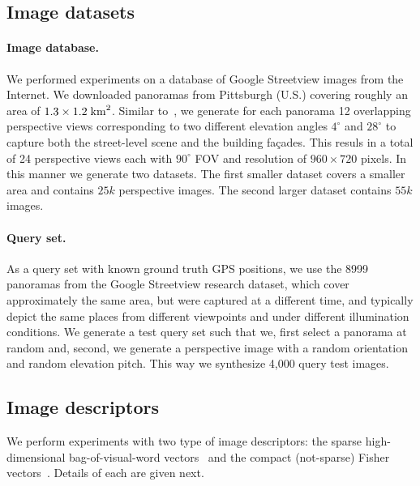         \subsection{Image datasets}
        \paragraph{Image database.}
        We performed experiments on a database of Google Streetview images from the Internet. We downloaded panoramas from Pittsburgh (U.S.) covering roughly an area of $1.3 \times 1.2 \; {\rm km}^2$. Similar to~\cite{Chen11}, we generate for each panorama 12 overlapping perspective views corresponding to two different elevation angles $4^\circ$ and $28^\circ$ to capture both the street-level scene and the building fa\c{c}ades. This resuls in a total of 24 perspective views each with $90^\circ$ FOV and resolution of $960 \times 720$ pixels. In this manner we generate two datasets. The first smaller dataset covers a smaller area and contains $25k$ perspective images. The second larger dataset contains $55k$ images.

        \paragraph{Query set.}
        As a query set with known ground truth GPS positions, we use the 8999 panoramas from the Google Streetview research dataset, which cover approximately the same area, but were captured at a different time, and typically depict the same places from different viewpoints and under different illumination conditions.         
        We generate a test query set such that we, first select a panorama at random and, second, we generate a perspective image with a random orientation and random elevation pitch. This way we synthesize 4,000 query test images.


       \subsection{Image descriptors}
        We perform experiments with two type of image descriptors: the sparse high-dimensional bag-of-visual-word vectors~\cite{Sivic03} and the compact (not-sparse) Fisher vectors~\cite{Jegou12}. Details of each are given next.

